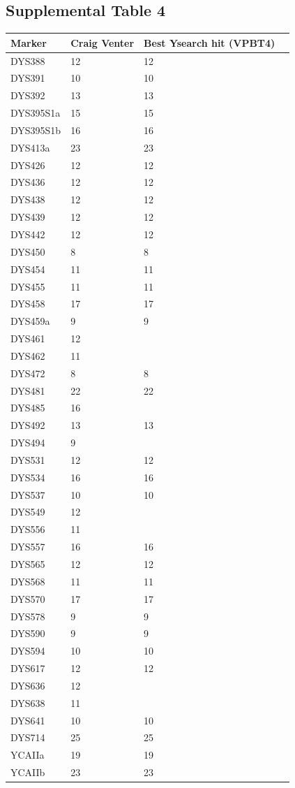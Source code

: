 \subsection{Supplemental Table 4}
\label{tab:sursuptab4}
\begin{tabularx}{\linewidth}{l l l l}
\hline
Marker & Craig Venter & Best Ysearch hit (VPBT4) \\
\hline
DYS388    & 12 & 12 \\
DYS391    & 10 & 10 \\
DYS392    & 13 & 13 \\
DYS395S1a & 15 & 15 \\
DYS395S1b & 16 & 16 \\
DYS413a   & 23 & 23 \\
DYS426    & 12 & 12 \\
DYS436    & 12 & 12 \\
DYS438    & 12 & 12 \\
DYS439    & 12 & 12 \\
DYS442    & 12 & 12 \\
DYS450    & 8  & 8  \\
DYS454    & 11 & 11 \\
DYS455    & 11 & 11 \\
DYS458    & 17 & 17 \\
DYS459a   & 9  & 9  \\
DYS461    & 12 &    \\
DYS462    & 11 &    \\
DYS472    & 8  & 8  \\
DYS481    & 22 & 22 \\
DYS485    & 16 &    \\
DYS492    & 13 & 13 \\
DYS494    & 9  &    \\
DYS531    & 12 & 12 \\
DYS534    & 16 & 16 \\
DYS537    & 10 & 10 \\
DYS549    & 12 &    \\
DYS556    & 11 &    \\
DYS557    & 16 & 16 \\
DYS565    & 12 & 12 \\
DYS568    & 11 & 11 \\
DYS570    & 17 & 17 \\
DYS578    & 9  & 9  \\
DYS590    & 9  & 9  \\
DYS594    & 10 & 10 \\
DYS617    & 12 & 12 \\
DYS636    & 12 &    \\
DYS638    & 11 &    \\
DYS641    & 10 & 10 \\
DYS714    & 25 & 25 \\
YCAIIa    & 19 & 19 \\
YCAIIb    & 23 & 23 \\
\hline
\end{tabularx}
